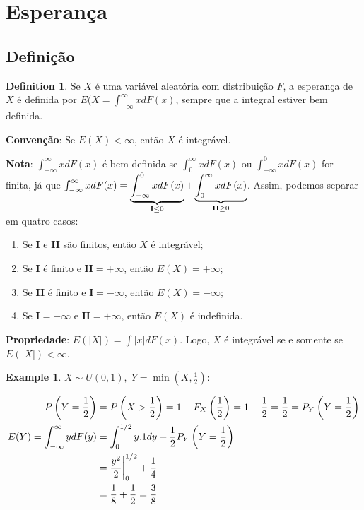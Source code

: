 \documentclass[
]{article}
\providecommand{\tightlist}{%
  \setlength{\itemsep}{0pt}\setlength{\parskip}{0pt}}
\theoremstyle{definition}
\newtheorem{definition}{Definition}[section]
\theoremstyle{definition}
\newtheorem{example}{Example}[section]
\theoremstyle{definition}
\theoremstyle{definition}
\theoremstyle{remark}
\begin{document}
\newpage

\hypertarget{esperanuxe7a}{%
\section{Esperança}\label{esperanuxe7a}}

\hypertarget{definiuxe7uxe3o}{%
\subsection{Definição}\label{definiuxe7uxe3o}}

\begin{definition}
Se \(X\) é uma variável aleatória com distribuição \(F\), a esperança de \(X\) é definida por \(E(X = \int_{-\infty}^{\infty}x dF(x)\), sempre que a integral estiver bem definida.
\end{definition}

\textbf{Convenção}: Se \(E(X) < \infty\), então \(X\) é integrável.

\textbf{Nota}: \(\int_{-\infty}^{\infty}xdF(x)\) é bem definida se \(\int_{0}^{\infty}xdF(x)\) ou \(\int_{-\infty}^{0}xdF(x)\) for finita, já que \(\int_{-\infty}^{\infty}xdF(x) = \underbrace{\int_{-\infty}^{0}xdF(x)}_{\mathclap{\mathbf{I} \le 0}} + \underbrace{\int_{0}^{\infty}xdF(x)}_{\mathclap{\mathbf{II} \ge 0}}\). Assim, podemos separar em quatro casos:

\begin{enumerate}
\def\labelenumi{\arabic{enumi}.}
\tightlist
\item
  Se \textbf{I} e \textbf{II} são finitos, então \(X\) é integrável;
\item
  Se \textbf{I} é finito e \(\mathbf{II} = +\infty\), então \(E(X) = +\infty\);
\item
  Se \textbf{II} é finito e \(\mathbf{I} = -\infty\), então \(E(X) = -\infty\);
\item
  Se \(\mathbf{I} = -\infty\) e \(\mathbf{II} = +\infty\), então \(E(X)\) é indefinida.
\end{enumerate}

\textbf{Propriedade}: \(E(|X|) = \int |x| dF(x)\). Logo, \(X\) é integrável se e somente se \(E(|X|) < \infty\).

\begin{example}
\(X \sim U(0,1),\; Y = \min\left(X,\frac{1}{2}\right)\):

\begin{align*}
P\left(Y = \frac{1}{2}\right) &= P\left(X > \frac{1}{2}\right) = 1 - F_{X}\left(\frac{1}{2}\right) = 1 - \frac{1}{2} = \frac{1}{2} = P_{Y}\left(Y = \frac{1}{2}\right)\\
E(Y) = \int_{-\infty}^{\infty}ydF(y) &= \int_{0}^{1/2}y.1dy + \frac{1}{2}P_{Y}\left(Y=\frac{1}{2}\right) \\
&= \frac{y^{2}}{2}\bigg{|}_{0}^{1/2} + \frac{1}{4} \\
&= \frac{1}{8} + \frac{1}{2} = \frac{3}{8}
\end{align*}
\end{example}
\end{document}
